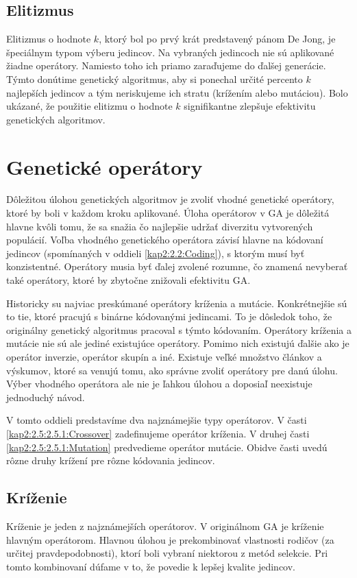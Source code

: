 \subsection{Elitizmus}\label{kap2:2.4:2.4.3:Elitism}
Elitizmus o hodnote $k$, ktorý bol po prvý krát predstavený pánom De Jong, je špeciálnym typom výberu jedincov. Na vybraných jedincoch nie sú aplikované žiadne operátory. Namiesto toho ich priamo zaraďujeme do ďalšej generácie. Týmto donútime genetický algoritmus, aby si ponechal určité percento $k$ najlepších jedincov a tým neriskujeme ich stratu (krížením alebo mutáciou). Bolo ukázané, že použitie elitizmu o hodnote $k$ signifikantne zlepšuje efektivitu genetických algoritmov.

\section{Genetické operátory}\label{kap2:2.5:Operators}
Dôležitou úlohou genetických algoritmov je zvoliť vhodné genetické operátory, ktoré by boli v každom kroku aplikované. Úloha operátorov v GA je dôležitá hlavne kvôli tomu, že sa snažia čo najlepšie udržať diverzitu vytvorených populácií. Voľba vhodného genetického operátora závisí hlavne na kódovaní jedincov (spomínaných v oddieli \ref{kap2:2.2:Coding}), s ktorým musí byť konzistentné. Operátory musia byť ďalej zvolené rozumne, čo znamená nevyberať také operátory, ktoré by zbytočne znižovali efektivitu GA. 

Historicky su najviac preskúmané operátory kríženia a mutácie. Konkrétnejšie sú to tie, ktoré pracujú s binárne kódovanými jedincami. To je dôsledok toho, že originálny genetický algoritmus pracoval s týmto kódovaním. Operátory kríženia a mutácie nie sú ale jediné existujúce operátory. Pomimo nich existujú ďalšie ako je operátor inverzie, operátor skupín a iné.
Existuje veľké množstvo článkov a výskumov, ktoré sa venujú tomu, ako správne zvoliť operátory pre danú úlohu. Výber vhodného operátora ale nie je ľahkou úlohou a doposiaľ neexistuje jednoduchý návod.

V tomto oddieli predstavíme dva najznámejšie typy operátorov. V časti \ref{kap2:2.5:2.5.1:Crossover} zadefinujeme operátor kríženia. V druhej časti \ref{kap2:2.5:2.5.1:Mutation} predvedieme operátor mutácie. Obidve časti uvedú rôzne druhy krížení pre rôzne kódovania jedincov.
\subsection{Kríženie}
Kríženie je jeden z najznámejších operátorov. V originálnom GA je kríženie hlavným operátorom. Hlavnou úlohou je prekombinovať vlastnosti rodičov (za určitej pravdepodobnosti), ktorí boli vybraní niektorou z metód selekcie. Pri tomto kombinovaní dúfame v to, že povedie k lepšej kvalite jedincov.

